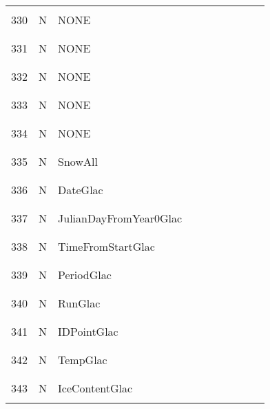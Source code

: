 \begin{longtable}{|c|c|l|c|c|c|c|p{}|c|p{}|}
&&&&&&&&&\\
330 & N & NONE & & & & & & & \\
&&&&&&&&&\\\hline%
&&&&&&&&&\\
331 & N & NONE & & & & & & & \\
&&&&&&&&&\\\hline%
&&&&&&&&&\\
332 & N & NONE & & & & & & & \\
&&&&&&&&&\\\hline%
&&&&&&&&&\\
333 & N & NONE & & & & & & & \\
&&&&&&&&&\\\hline%
&&&&&&&&&\\
334 & N & NONE & & & & & & & \\
&&&&&&&&&\\\hline%
&&&&&&&&&\\
335 & N & SnowAll & & & & & & & \\
&&&&&&&&&\\\hline%
&&&&&&&&&\\
336 & N & DateGlac & & & & & & & \\
&&&&&&&&&\\\hline%
&&&&&&&&&\\
337 & N & JulianDayFromYear0Glac & & & & & & & \\
&&&&&&&&&\\\hline%
&&&&&&&&&\\
338 & N & TimeFromStartGlac & & & & & & & \\
&&&&&&&&&\\\hline%
&&&&&&&&&\\
339 & N & PeriodGlac & & & & & & & \\
&&&&&&&&&\\\hline%
&&&&&&&&&\\
340 & N & RunGlac & & & & & & & \\
&&&&&&&&&\\\hline%
&&&&&&&&&\\
341 & N & IDPointGlac & & & & & & & \\
&&&&&&&&&\\\hline%
&&&&&&&&&\\
342 & N & TempGlac & & & & & & & \\
&&&&&&&&&\\\hline%
&&&&&&&&&\\
343 & N & IceContentGlac & & & & & & & \\
&&&&&&&&&\\\hline%

\end{longtable}
